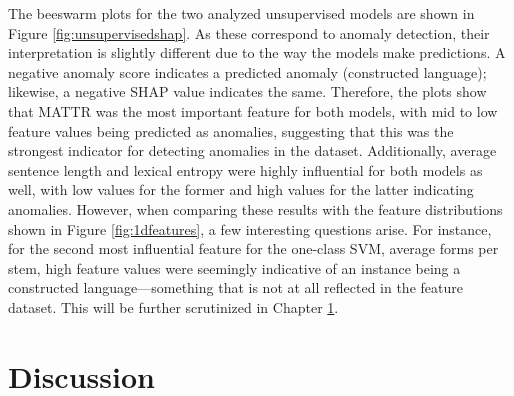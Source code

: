 \documentclass[12pt,a4paper]{article}
\numberwithin{figure}{section}
\numberwithin{table}{section}
\numberwithin{definition}{section}
\begin{document}
The beeswarm plots for the two analyzed unsupervised models are shown in Figure \ref{fig:unsupervisedshap}. As these correspond to anomaly detection, their interpretation is slightly different due to the way the models make predictions. A negative anomaly score indicates a predicted anomaly (constructed language); likewise, a negative SHAP value indicates the same. Therefore, the plots show that MATTR was the most important feature for both models, with mid to low feature values being predicted as anomalies, suggesting that this was the strongest indicator for detecting anomalies in the dataset. Additionally, average sentence length and lexical entropy were highly influential for both models as well, with low values for the former and high values for the latter indicating anomalies. However, when comparing these results with the feature distributions shown in Figure \ref{fig:1dfeatures}, a few interesting questions arise. For instance, for the second most influential feature for the one-class SVM, average forms per stem, high feature values were seemingly indicative of an instance being a constructed language---something that is not at all reflected in the feature dataset. This will be further scrutinized in Chapter \ref{sec:discussion}.



\clearpage
\newpage
\section{Discussion}
\label{sec:discussion}

\end{document}
